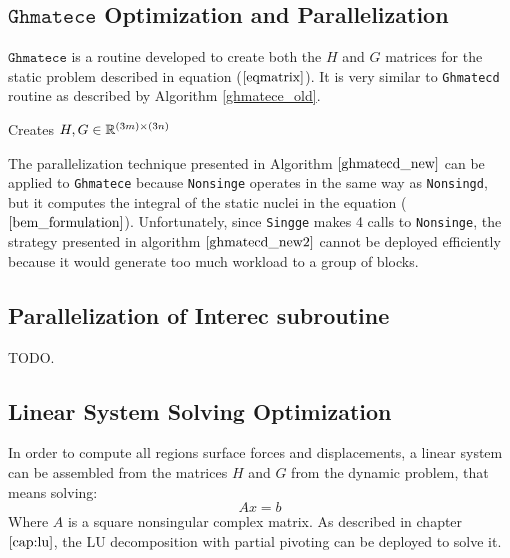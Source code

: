 \subsection{$\texttt{Ghmatece}$ Optimization and Parallelization}

$\texttt{Ghmatece}$ is a routine developed to create both the $H$ and $G$ matrices for the static problem 
described in equation ($\ref{eqmatrix}$). It is very similar to \texttt{Ghmatecd} routine as described by 
Algorithm \ref{ghmatece_old}. 

\begin{algorithm}[H]
\caption{Creates $H, G \in \mathbb{R}^{(3m)\times(3n)}$}
\label{ghmatece_old}
\begin{algorithmic}[1]
				\Else
				\EndIf
			\EndFor
	 \EndFor
	\EndProcedure
\end{algorithmic}
\end{algorithm}

The parallelization technique presented in Algorithm $\ref{ghmatecd_new}$ can be applied to \texttt{Ghmatece} 
because \texttt{Nonsinge} operates in the same way as \texttt{Nonsingd}, but it computes the integral 
of the static nuclei in the equation ($\ref{bem_formulation}$). Unfortunately, since 
\texttt{Singge} makes 4 calls to \texttt{Nonsinge}, the strategy presented in 
algorithm $\ref{ghmatecd_new2}$ cannot be deployed efficiently because it would 
generate too much workload to a group of blocks.

\subsection{Parallelization of Interec subroutine}
TODO.

\subsection{Linear System Solving Optimization}
In order to compute all regions surface forces and displacements, a linear system can be assembled 
from the matrices $H$ and $G$ from the dynamic problem, that means solving: 
\begin{equation}
	Ax = b
\end{equation}
Where $A$ is a square nonsingular complex matrix. As described in chapter $\ref{cap:lu}$, 
the LU decomposition with partial pivoting can be deployed to solve it.

